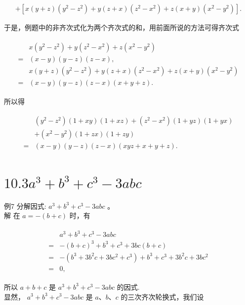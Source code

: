 \documentclass[10pt]{article}
\begin{document}
\begin{align*}
+\left[x(y+z)\left(y^{2}-z^{2}\right)+y(z+x)\left(z^{2}-x^{2}\right)+z(x+y)\left(x^{2}-y^{2}\right)\right] .
\end{align*}

于是，例题中的非齐次式化为两个齐次式的和，用前面所说的方法可得齐次式

\begin{align*}
\begin{aligned}
& x\left(y^{2}-z^{2}\right)+y\left(z^{2}-x^{2}\right)+z\left(x^{2}-y^{2}\right) \\
= & (x-y)(y-z)(z-x), \\
& x(y+z)\left(y^{2}-z^{2}\right)+y(z+x)\left(z^{2}-x^{2}\right)+z(x+y)\left(x^{2}-y^{2}\right) \\
= & (x-y)(y-z)(z-x)(x+y+z) .
\end{aligned}
\end{align*}

所以得

\begin{align*}
\begin{aligned}
& \left(y^{2}-z^{2}\right)(1+x y)(1+x z)+\left(z^{2}-x^{2}\right)(1+y z)(1+y x) \\
& +\left(x^{2}-y^{2}\right)(1+z x)(1+z y) \\
= & (x-y)(y-z)(z-x)(x y z+x+y+z) .
\end{aligned}
\end{align*}

\section*{$10.3 a^{3}+b^{3}+c^{3}-3 a b c$}
例7 分解因式: $a^{3}+b^{3}+c^{3}-3 a b c$ 。\\
解 在 $a=-(b+c)$ 时，有

\begin{align*}
\begin{aligned}
& a^{3}+b^{3}+c^{3}-3 a b c \\
= & -(b+c)^{3}+b^{3}+c^{3}+3 b c(b+c) \\
= & -\left(b^{3}+3 b^{2} c+3 b c^{2}+c^{3}\right)+b^{3}+c^{3}+3 b^{2} c+3 b c^{2} \\
= & 0,
\end{aligned}
\end{align*}

所以 $a+b+c$ 是 $a^{3}+b^{3}+c^{3}-3 a b c$ 的因式.\\
显然， $a^{3}+b^{3}+c^{3}-3 a b c$ 是 $a 、 b 、 c$ 的三次齐次轮换式，我们设
\end{document}
